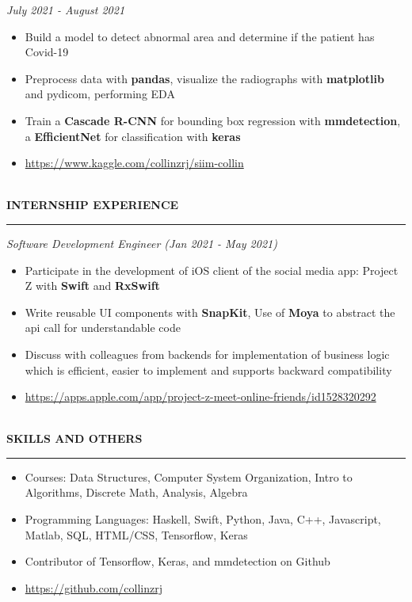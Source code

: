 \documentclass{article}
\begin{document}
\emph{July 2021 - August 2021}
\begin{itemize}[leftmargin=*,topsep=0pt]
\item Build a model to detect abnormal area and determine if the patient has Covid-19
\item Preprocess data with \textbf{pandas}, visualize the radiographs with \textbf{matplotlib} and pydicom, performing EDA
\item Train a \textbf{Cascade R-CNN} for bounding box regression with \textbf{mmdetection}, a \textbf{EfficientNet} for classification with \textbf{keras}
\item \url{https://www.kaggle.com/collinzrj/siim-collin}

\end{itemize} \ \\ 
\noindent
{\textbf{INTERNSHIP EXPERIENCE}}\newline
\rule{\textwidth}{1pt}\newline
\emph{Software Development Engineer (Jan 2021 - May 2021)}
\begin{itemize}[leftmargin=*,topsep=0pt]
\item Participate in the development of iOS client of the social media app: Project Z with \textbf{Swift} and \textbf{RxSwift}
\item Write reusable UI components with \textbf{SnapKit}, Use of \textbf{Moya} to abstract the api call for understandable code
\item Discuss with colleagues from backends for implementation of business logic which is efficient, easier to implement and supports backward compatibility
\item \url{https://apps.apple.com/app/project-z-meet-online-friends/id1528320292}

\end{itemize} \ \\ 
\noindent
{\textbf{SKILLS AND OTHERS}}\newline
\rule{\textwidth}{1pt}\begin{itemize}[leftmargin=*,topsep=0pt]
\item Courses: Data Structures, Computer System Organization, Intro to Algorithms, Discrete Math, Analysis, Algebra
\item Programming Languages: Haskell, Swift, Python, Java, C++, Javascript, Matlab, SQL, HTML/CSS, Tensorflow, Keras
\item Contributor of Tensorflow, Keras, and mmdetection on Github
\item \url{https://github.com/collinzrj}

\end{itemize} \ \\ 
\end{document}
